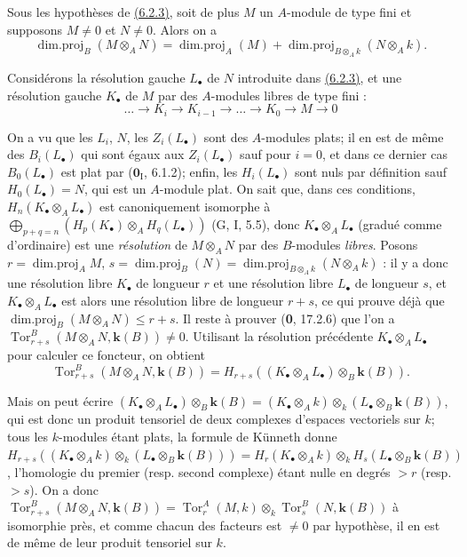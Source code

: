 \begin{proposition}[6.2.4]
\label{IV.6.2.4}
Sous les hypothèses de \textup{\hyperref[canon-index.ega4.c04.prop.6-2-3]{(6.2.3)}}, soit
de plus $M$ un $A$-module de type fini et supposons $M\neq0$ et
$N\neq0$. Alors on a
\begin{equation}
 \operatorname{dim.proj}_B(M\otimes_AN)=
 \operatorname{dim.proj}_A(M)+
 \operatorname{dim.proj}_{B\otimes_Ak}(N\otimes_Ak).
 \label{IV.6.2.4.1}\tag{6.2.4.1}
\end{equation}
\end{proposition}

Considérons la résolution gauche $L_\bullet$ de $N$ introduite dans
{\hyperref[canon-index.ega4.c04.prop.6-2-3]{(6.2.3)}}, et une résolution gauche
$K_\bullet$ de $M$ par des $A$-modules libres de type fini :
\[
 \ldots\longrightarrow K_i\longrightarrow K_{i-1}\longrightarrow
 \ldots\longrightarrow K_0\longrightarrow M\longrightarrow0
\]

On a vu que les $L_i$, $N$, les $Z_i(L_\bullet)$ sont des $A$-modules
plats; il en est de même des $B_i(L_\bullet)$ qui sont égaux aux
$Z_i(L_\bullet)$ sauf pour $i=0$, et dans ce dernier cas
$B_0(L_\bullet)$ est
plat par ($\mathbf{0}_{\mathrm I}$, 6.1.2); enfin, les $H_i(L_\bullet)$ sont nuls
par définition sauf $H_0(L_\bullet)=N$, qui est un $A$-module plat. On
sait que, dans ces conditions,
$H_n(K_\bullet\otimes_AL_\bullet)$ est canoniquement isomorphe à
$\bigoplus_{p+q=n}(H_p(K_\bullet)\otimes_AH_q(L_\bullet))$ (G, I, 5.5), donc $K_\bullet\otimes_AL_\bullet$ (gradué comme
d'ordinaire) est une \emph{résolution} de $M\otimes_AN$ par des $B$-modules
\emph{libres}. Posons $r=\operatorname{dim.proj}_AM$,
$s=\operatorname{dim.proj}_B(N)=\operatorname{dim.proj}_{B\otimes_Ak}(N\otimes_Ak)$ :
il y a donc une résolution libre $K_\bullet$ de longueur $r$ et une
résolution libre $L_\bullet$ de longueur $s$, et
$K_\bullet\otimes_AL_\bullet$ est alors une résolution libre de longueur
$r+s$, ce qui prouve déjà que
$\operatorname{dim.proj}_B(M\otimes_AN)\leq r+s$. Il reste à prouver
(\textbf{0}, 17.2.6) que l'on a $\operatorname{Tor}^{B}_{r+s}(M\otimes_AN,\boldsymbol{k}(B))\neq0$.
Utilisant la résolution précédente $K_\bullet\otimes_AL_\bullet$ pour
calculer ce foncteur, on obtient
\[
 \operatorname{Tor}^{B}_{r+s}(M\otimes_AN,\boldsymbol{k}(B))=
 H_{r+s}((K_\bullet\otimes_AL_\bullet)\otimes_B\boldsymbol{k}(B)).
\]

Mais on peut écrire
$(K_\bullet\otimes_AL_\bullet)\otimes_B\boldsymbol{k}(B)=(K_\bullet\otimes_Ak)\otimes_k(L_\bullet\otimes_B\boldsymbol{k}(B))$,
qui est donc un produit tensoriel de deux complexes d'espaces
vectoriels sur $k$; tous les $k$-modules étant plats, la formule de
Künneth donne
$H_{r+s}((K_\bullet\otimes_Ak)\otimes_k(L_\bullet\otimes_B\boldsymbol{k}(B)))=H_r(K_\bullet\otimes_Ak)\otimes_kH_s(L_\bullet\otimes_B\boldsymbol{k}(B))$,
l'homologie du premier (resp. second complexe) étant nulle en degrés
$>r$ (resp. $>s$). On a donc
$\operatorname{Tor}^{B}_{r+s}(M\otimes_AN,\boldsymbol{k}(B))=\operatorname{Tor}^{A}_{r}(M,k)\otimes_k\operatorname{Tor}^{B}_{s}(N,\boldsymbol{k}(B))$
à isomorphie près, et comme chacun des facteurs est $\neq0$ par
hypothèse, il en est de même de leur produit tensoriel sur $k$.

